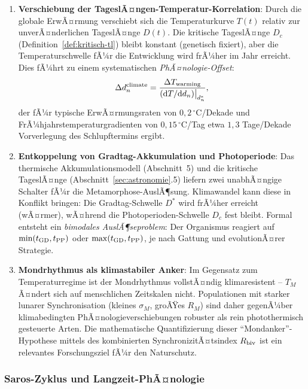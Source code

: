 ﻿\documentclass[12pt, a4paper]{article}
\theoremstyle{definition}
\newcommand{\dd}{\mathrm{d}}
\begin{document}
\begin{enumerate}
  \item \textbf{Verschiebung der TageslÃ¤ngen-Temperatur-Korrelation}:
        Durch die globale ErwÃ¤rmung verschiebt sich die Temperaturkurve $T(t)$
        relativ zur unverÃ¤nderlichen TageslÃ¤nge $D(t)$. Die kritische TageslÃ¤nge
        $D_c$ (Definition~\ref{def:kritisch-tl}) bleibt konstant (genetisch
        fixiert), aber die Temperaturschwelle fÃ¼r die Entwicklung wird frÃ¼her im
        Jahr erreicht. Dies fÃ¼hrt zu einem systematischen \emph{PhÃ¤nologie-Offset}:
        \[
          \Delta d_n^{\rm climate} = \frac{\Delta T_{\rm warming}}{(\dd T/\dd d_n)\big|_{d_n^*}},
        \]
        der fÃ¼r typische ErwÃ¤rmungsraten von $0{,}2\,^\circ\text{C}$/Dekade und
        FrÃ¼hjahrstemperaturgradienten von $0{,}15\,^\circ\text{C}$/Tag etwa
        $1{,}3$ Tage/Dekade Vorverlegung des Schlupftermins ergibt.

  \item \textbf{Entkoppelung von Gradtag-Akkumulation und Photoperiode}:
        Das thermische Akkumulationsmodell (Abschnitt~5) und die kritische
        TageslÃ¤nge (Abschnitt~\ref{sec:astronomie}.5) liefern zwei unabhÃ¤ngige
        Schalter fÃ¼r die Metamorphose-AuslÃ¶sung. Klimawandel kann diese in
        Konflikt bringen: Die Gradtag-Schwelle $D^*$ wird frÃ¼her erreicht (wÃ¤rmer),
        wÃ¤hrend die Photoperioden-Schwelle $D_c$ fest bleibt. Formal entsteht ein
        \emph{bimodales AuslÃ¶seproblem}: Der Organismus reagiert auf
        $\min(t_{\rm GD}, t_{\rm PP})$ oder $\max(t_{\rm GD}, t_{\rm PP})$,
        je nach Gattung und evolutionÃ¤rer Strategie.

  \item \textbf{Mondrhythmus als klimastabiler Anker}:
        Im Gegensatz zum Temperaturregime ist der Mondrhythmus vollstÃ¤ndig
        klimaresistent -- $T_M$ Ã¤ndert sich auf menschlichen Zeitskalen nicht.
        Populationen mit starker lunarer Synchronisation (kleines $\sigma_M$,
        groÃŸes $R_M$) sind daher gegenÃ¼ber klimabedingten PhÃ¤nologieverschie\-bungen
        robuster als rein photothermisch gesteuerte Arten. Die mathematische
        Quantifizierung dieser ``Mondanker''-Hypothese mittels des kombinierten
        SynchronizitÃ¤tsindex $R_{\rm biv}$ ist ein relevantes Forschungsziel fÃ¼r
        den Naturschutz.
\end{enumerate}

\subsubsection{Saros-Zyklus und Langzeit-PhÃ¤nologie}
\end{document}
